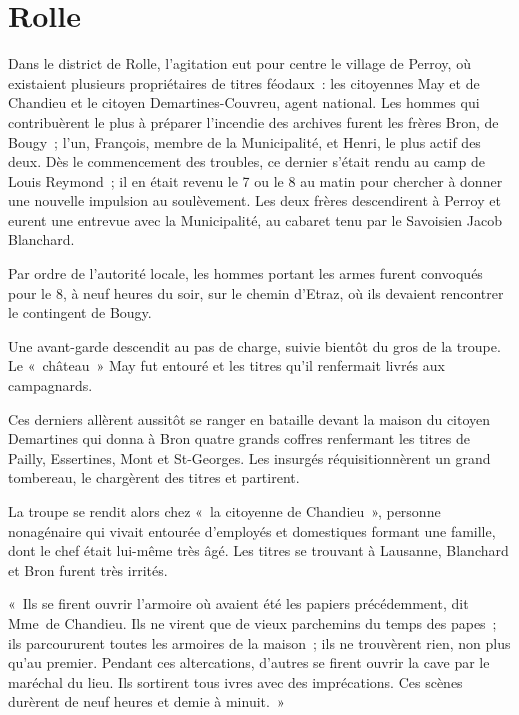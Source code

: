 \documentclass[french,twoside]{book} %
\newenvironment{quoteblock}%
  {\begin{quoting}}
  {\end{quoting}}
\newenvironment{quotebar}{%
    \def\FrameCommand{{\color{rubric!10!}\vrule width 0.5em} \hspace{0.9em}}%
    \def\OuterFrameSep{\itemsep} %
    \MakeFramed {\advance\hsize-\width \FrameRestore}
  }%
  {%
    \endMakeFramed
  }
\renewenvironment{quoteblock}%
  {%
    \savenotes
    \setstretch{0.9}
    \normalfont
    \begin{quotebar}
  }
  {%
    \end{quotebar}
    \spewnotes
  }
\begin{document}
\section[Rolle]{Rolle}
\noindent Dans le district de Rolle, l’agitation eut pour centre le village de Perroy, où existaient plusieurs propriétaires de titres féodaux : les citoyennes May et de Chandieu et le citoyen Demartines-Couvreu, agent national. Les hommes qui contribuèrent le plus à préparer l’incendie des archives furent les frères Bron, de Bougy ; l’un, François, membre de la Municipalité, et Henri, le plus actif des deux. Dès le commencement des troubles, ce dernier s’était rendu au camp de Louis Reymond ; il en était revenu le 7 ou le 8 au matin pour chercher à donner une nouvelle impulsion au soulèvement. Les deux frères descendirent à Perroy et eurent une entrevue avec la Municipalité, au cabaret tenu par le Savoisien Jacob Blanchard.\par
Par ordre de l’autorité locale, les hommes portant les armes furent convoqués pour le 8, à neuf heures du soir, sur le chemin d’Etraz, où ils devaient rencontrer le contingent de Bougy.\par
Une avant-garde descendit au pas de charge, suivie bientôt du gros de la troupe. Le « château » May fut entouré et les titres qu’il renfermait livrés aux campagnards.\par
Ces derniers allèrent aussitôt se ranger en bataille devant la maison du citoyen Demartines qui donna à Bron quatre grands coffres renfermant les titres de Pailly, Essertines, Mont et St-Georges. Les insurgés réquisitionnèrent un grand tombereau, le chargèrent des titres et partirent.\par
La troupe se rendit alors chez « la citoyenne de Chandieu », personne nonagénaire qui vivait entourée d’employés et domestiques formant une famille, dont le chef était lui-même très âgé. Les titres se trouvant à Lausanne, Blanchard et Bron furent très irrités.\par

\begin{quoteblock}
 \noindent « Ils se firent ouvrir l’armoire où avaient été les papiers précédemment, dit Mme de Chandieu. Ils ne virent que de vieux parchemins du temps des papes ; ils parcoururent toutes les armoires de la maison ; ils ne trouvèrent rien, non plus qu’au premier. Pendant ces altercations, d’autres se firent ouvrir la cave par le maréchal du lieu. Ils sortirent tous ivres avec des imprécations. Ces scènes durèrent de neuf heures et demie à minuit. »
 \end{quoteblock}
\end{document}
